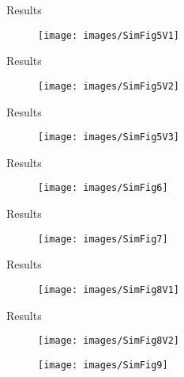 \documentclass{beamer}
\begin{document}
\begin{frame}{Results}
\begin{figure}
	\centering
	\texttt{[image: images/SimFig5V1]}
\end{figure}
\end{frame}

\begin{frame}{Results}
\begin{figure}
	\centering
	\texttt{[image: images/SimFig5V2]}
\end{figure}
\end{frame}

\begin{frame}{Results}
	\begin{figure}
		\centering
		\texttt{[image: images/SimFig5V3]}
	\end{figure}
\end{frame}

\begin{frame}{Results}
	\begin{figure}
		\centering
		\texttt{[image: images/SimFig6]}
	\end{figure}
\end{frame}

\begin{frame}{Results}
	\begin{figure}
		\centering
		\texttt{[image: images/SimFig7]}
	\end{figure}
\end{frame}


\begin{frame}{Results}
	\begin{figure}
		\centering
		\texttt{[image: images/SimFig8V1]}
	\end{figure}
\end{frame}
\begin{frame}{Results}
	\begin{figure}
		\centering
		\texttt{[image: images/SimFig8V2]}
	\end{figure}
\end{frame}


\begin{frame}
	\begin{figure}
		\centering
		\texttt{[image: images/SimFig9]}
	\end{figure}
\end{frame}
\end{document}
